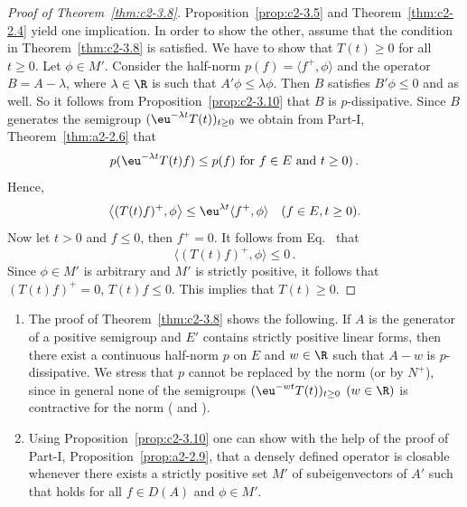 \begin{proof}[Proof of Theorem~\ref{thm:c2-3.8}]
Proposition~\ref{prop:c2-3.5} and Theorem~\ref{thm:c2-2.4}   yield one implication. 
In order to show the other, assume that the condition in
Theorem~\ref{thm:c2-3.8}   is satisfied. 
We have to show that $T(t) \geq 0$ for all $t \geq 0$.
Let $\phi \in M'$. 
Consider the half-norm $p(f) = \langle f^{+},\phi \rangle$ and the operator $B = A - \lambda$, where $\lambda \in \R$ is such that $A'\phi \leq \lambda\phi$. 
Then $B$ satisfies $B'\phi \leq 0$ and    as well. 
So it follows from Proposition~\ref{prop:c2-3.10}   that $B$ is $p$-dissipative.
Since $B$ generates the semigroup $(\eu^{-\lambda t}T(t))_{t \geq 0}$ we obtain from Part-I, Theorem~\ref{thm:a2-2.6} that 
\[
p(\eu^{-\lambda t}T(t)f) \leq p(f) \text{ for } f \in E \text{ and } t\geq 0)\,.
\]
Hence,
\begin{equation} \label{eq:c2-3.5}
\left\langle (T(t)f)^{+}, \phi \right\rangle \leq \eu^{\lambda t} \langle f^{+}, \phi \rangle \quad (f \in E, t \geq 0).
\end{equation}
Now let $t > 0$ and $f \leq 0$, then $f^{+} = 0$. 
It follows from  Eq.~ that 
\[
\langle (T(t)f)^{+},\phi \rangle \leq 0\,.
\]
Since $\phi \in M'$ is arbitrary and $M'$ is strictly positive, it follows that $(T(t)f)^{+} = 0$, \ie $T(t)f \leq 0$. 
This implies that $T(t) \geq 0$.
\end{proof}
\begin{remark}\label{rem:c2-3.11}
\begin{enumerate}[\upshape (i), wide, labelindent=.25em]%
\item \label{rem:c2-3.11-1}
The proof of Theorem~\ref{thm:c2-3.8}   shows the following. 
If\/ $A$ is the generator of a positive semigroup and $E'$ contains strictly
positive linear forms, then there exist a continuous half-norm $p$ on
$E$ and $w \in \R$ such that $A - w$ is $p$-dissipative. 
We stress that $p$ cannot be replaced by the norm (or by $N^{+}$), since in general none of the semigroups $(\eu^{-wt}T(t))_{t \geq 0}$ $(w \in \R)$ is contractive for the norm (\cf \textcite{derndinger:1984} and \textcite{battydavies:1983}).
\item  \label{rem:c2-3.11-2}
Using Proposition~\ref{prop:c2-3.10}   one can show with the help of the proof of 
Part-I, Proposition~\ref{prop:a2-2.9}, that a densely defined operator is closable whenever
there exists a strictly positive set $M'$ of subeigenvectors of\/ $A'$
such that    holds for all $f \in D(A)$ and $\phi \in M'$.
\end{enumerate}
\end{remark}
